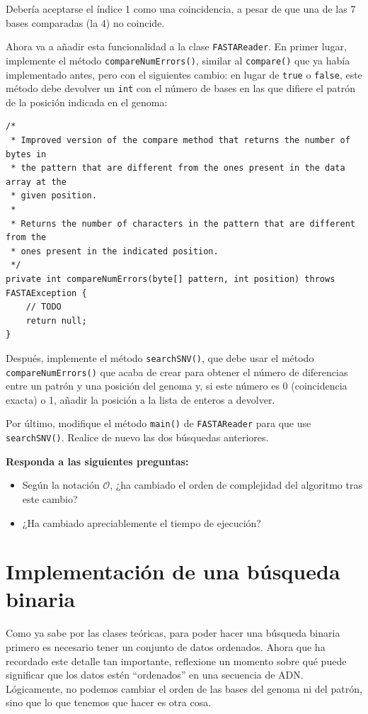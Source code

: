 \documentclass[10pt,a4paper,spanish]{article}
\newcommand{\code}[1]{\texttt{#1}}
\newcommand{\bigO}{\mathcal{O}}
\begin{document}
Debería aceptarse el índice 1 como una coincidencia, a pesar de que una de las 7 bases comparadas (la 4) no coincide.

Ahora va a añadir esta funcionalidad a la clase \code{FASTAReader}. En primer lugar, implemente el método \code{compareNumErrors()}, similar al \code{compare()} que ya había implementado antes, pero con el siguientes cambio: en lugar de \code{true} o \code{false}, este método debe devolver un \code{int} con el número de bases en las que difiere el patrón de la posición indicada en el genoma:

\begin{verbatim}
/*
 * Improved version of the compare method that returns the number of bytes in
 * the pattern that are different from the ones present in the data array at the
 * given position.
 * 
 * Returns the number of characters in the pattern that are different from the
 * ones present in the indicated position.
 */
private int compareNumErrors(byte[] pattern, int position) throws FASTAException {
    // TODO
    return null;
}
\end{verbatim}

Después, implemente el método \code{searchSNV()}, que debe usar el método \code{compareNumErrors()} que acaba de crear para obtener el número de diferencias entre un patrón y una posición del genoma y, si este número es 0 (coincidencia exacta) o 1, añadir la posición a la lista de enteros a devolver.

Por último, modifique el método \code{main()} de \code{FASTAReader} para que use \code{searchSNV()}. Realice de nuevo las dos búsquedas anteriores.

\textbf{Responda a las siguientes preguntas:}

\begin{itemize}
    \item Según la notación $\bigO$, ¿ha cambiado el orden de complejidad del algoritmo tras este cambio?
    \item ¿Ha cambiado apreciablemente el tiempo de ejecución?
\end{itemize}

\section{Implementación de una búsqueda binaria}

Como ya sabe por las clases teóricas, para poder hacer una búsqueda binaria primero es necesario tener un conjunto de datos ordenados. Ahora que ha recordado este detalle tan importante, reflexione un momento sobre qué puede significar que los datos estén ``ordenados'' en una secuencia de ADN. Lógicamente, no podemos cambiar el orden de las bases del genoma ni del patrón, sino que lo que tenemos que hacer es otra cosa.
\end{document}
